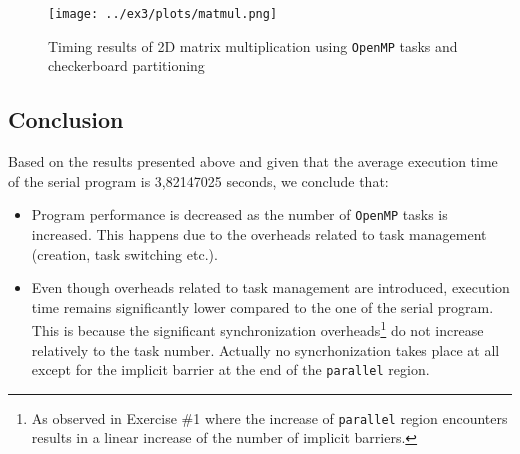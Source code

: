 \documentclass{article}
\def\code#1{\texttt{#1}}
\begin{document}
\begin{figure}[htbp]
  \centering
  \texttt{[image: ../ex3/plots/matmul.png]}
  \caption{Timing results of 2D matrix multiplication using \texttt{OpenMP}
           tasks and checkerboard partitioning}
\end{figure}


\subsection{Conclusion}
Based on the results presented above and given that the average execution time of the serial
program is 3,82147025 seconds, we conclude that:

\begin{itemize}
 \item Program performance is decreased as the number of \texttt{OpenMP} tasks is increased.
       This happens due to the overheads related to task management (creation,
       task switching etc.).
 \item Even though overheads related to task management are introduced, execution time remains
       significantly lower compared to the one of the serial program. This is because
       the significant synchronization overheads\footnote{As observed in Exercise \#1 where
       the increase of \code{parallel} region encounters results in a linear increase of
       the number of implicit barriers.} do not increase relatively to the task number.
       Actually no syncrhonization takes place at all except for the implicit barrier
       at the end of the \code{parallel} region.
\end{itemize}
\end{document}
